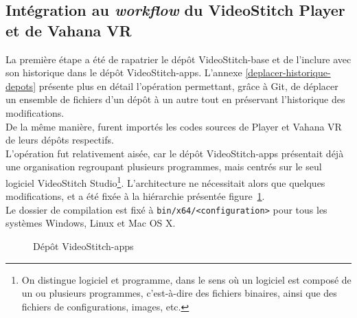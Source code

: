 \subsection{Intégration au \textit{workflow} du VideoStitch Player et de Vahana VR}
La première étape a été de rapatrier le dépôt VideoStitch-base et de l'inclure
avec son historique dans le dépôt VideoStitch-apps. L'annexe \ref{deplacer-historique-depots}
présente plus en détail l'opération permettant, grâce à Git, de déplacer un ensemble 
de fichiers d'un dépôt à un autre tout en préservant l'historique des modifications.\\
De la même manière, furent importés les codes sources de Player et Vahana VR de 
leurs dépôts respectifs.\\
L'opération fut relativement aisée, car le dépôt VideoStitch-apps présentait déjà
une organisation regroupant plusieurs programmes, mais centrés sur le seul logiciel
VideoStitch Studio\footnote{On distingue logiciel et programme, dans le sens où un logiciel
est composé de un ou plusieurs programmes, c'est-à-dire des fichiers binaires, ainsi que des
fichiers de configurations, images, etc.\cite{logiciel}}. L'architecture ne nécessitait alors que quelques modifications, et
a été fixée à la hiérarchie présentée figure~\ref{videostitch-apps}.\\
Le dossier de compilation est fixé à \texttt{bin/x64/<configuration>}
pour tous les systèmes Windows, Linux et Mac OS X.
\begin{figure}
  \caption{Dépôt VideoStitch-apps}
  \label{videostitch-apps}
\end{figure}
